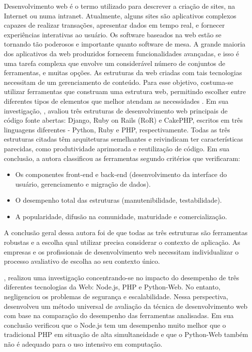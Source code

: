 Desenvolvimento web é o termo utilizado para descrever a criação de sites, na Internet ou numa intranet. Atualmente, alguns sites são aplicativos complexos capazes de 
realizar transações, apresentar dados em tempo real,
e fornecer experiências interativas ao usuário. Os software baseados na web estão se tornando tão poderosos e importante quanto
software de mesa. A grande maioria dos aplicativos da web produzidos fornecem funcionalidades avançadas, e isso é uma tarefa complexa que envolve um considerável número de conjuntos de ferramentas, e muitas opções. As estruturas da web criadas com tais tecnologias necessitam de um gerenciamento de conteúdo. Para esse objetivo, costuma-se utilizar ferramentas que construam uma estrutura web, permitindo escolher entre diferentes tipos de elementos que melhor atendam as necessidades \cite{HackerScot2008}.
Em sua investigação, \cite{plekhanova2009evaluating}, avaliou  três estruturas de desenvolvimento web principais de código fonte abertas: Django, Ruby on Rails (RoR) e CakePHP, escritos em três linguagens diferentes - Python, Ruby e PHP, respectivamente. Todas as três estruturas citadas têm arquiteturas semelhantes e reivindicam ter características parecidas, como produtividade aprimorada e reutilização de código. Em sua conclusão, a autora classificou as ferramentas segundo critérios
que verificaram:
\begin{itemize}
	\item Os componentes front-end e back-end (desenvolvimento da interface do usuário, gerenciamento e migração de dados).
	\item O desempenho total
	 das estruturas (manutenibilidade, testabilidade).
	 \item A popularidade, difusão na comunidade, maturidade e comercialização.
\end{itemize}

A conclusão geral dessa autora foi de que todas as três estruturas são ferramentas robustas e a escolha qual utilizar precisa considerar o contexto de aplicação. As empresas e os profissionais de desenvolvimento web necessitam individualizar o processo avaliativo de escolha ao seu contexto único.


\nocite{an2009static}

\cite{lei2014performance}, realizou uma investigação concentrando-se no impacto do desempenho de três diferentes tecnologias da Web: Node.js, PHP e
Python-Web. No entanto, negligenciou os problemas de segurança e escalabilidade. Nessa perspectiva, desenvolveu um método universal de avaliação da técnica de desenvolvimento web com base na comparação do desempenho das ferramentas analisadas. Em sua conclusão verificou que o Node.js tem um desempenho muito melhor que o tradicional PHP em situação de alta simultaneidade e que o Python-Web também não é adequado para o uso intensivo em computação. 

